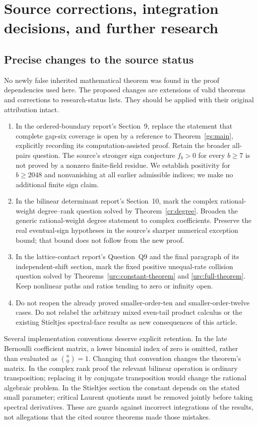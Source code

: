 \section{Source corrections, integration decisions, and further research}
\label{audit:section}

\subsection{Precise changes to the source status}

No newly false inherited mathematical theorem was found in the
proof dependencies used here. The proposed changes are extensions
of valid theorems and corrections to research-status lists.
They should be applied with their original attribution intact.

\begin{enumerate}
\item In the ordered-boundary report's Section~9, replace the
statement that complete gap-six coverage is open by a reference
to Theorem~\ref{gs:main}, explicitly recording its
computation-assisted proof. Retain the broader all-pairs question.
The source's stronger sign conjecture
$f_b>0$ for every $b\ge7$ is not proved by a nonzero finite-field
residue. We establish positivity for $b\ge2048$ and nonvanishing
at all earlier admissible indices; we make no additional finite
sign claim.
\item In the bilinear determinant report's Section~10, mark the
complex rational-weight degree--rank question solved by
Theorem~\ref{cr:degree}. Broaden the generic rational-weight
degree statement to complex coefficients. Preserve the real
eventual-sign hypotheses in the source's sharper numerical
exception bound; that bound does not follow from the new proof.
\item In the lattice-contact report's Question~Q9 and the final
paragraph of its independent-shift section, mark the fixed
positive unequal-rate collision question solved by
Theorems~\ref{urc:constant-theorem} and \ref{urc:full-theorem}.
Keep nonlinear paths and ratios tending to zero or infinity open.
\item Do not reopen the already proved smaller-order-ten and
smaller-order-twelve cases. Do not relabel the arbitrary mixed
even-tail product calculus or the existing Stieltjes spectral-face
results as new consequences of this article.
\end{enumerate}

Several implementation conventions deserve explicit retention.
In the late Bernoulli coefficient matrix, a lower binomial index
of zero is omitted, rather than evaluated as $\binom n0=1$.
Changing that convention changes the theorem's matrix. In the
complex rank proof the relevant bilinear operation is ordinary
transposition; replacing it by conjugate transposition would
change the rational algebraic problem. In the Stieltjes section
the constant depends on the stated small parameter; critical
Laurent quotients must be removed jointly before taking spectral
derivatives. These are guards against incorrect integrations of
the results, not allegations that the cited source theorems made
those mistakes.

